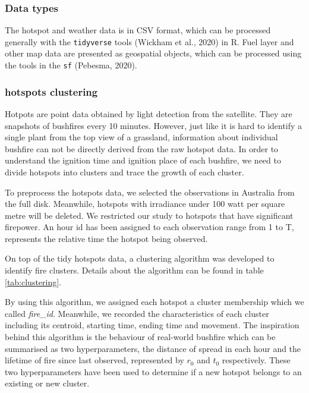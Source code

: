 \documentclass[11pt,a4paper,]{article}
\begin{document}
\hypertarget{data-types}{%
\subsubsection{Data types}\label{data-types}}

The hotspot and weather data is in CSV format, which can be processed generally with the \texttt{tidyverse} tools (Wickham et al., 2020) in R. Fuel layer and other map data are presented as geospatial objects, which can be processed using the tools in the \texttt{sf} (Pebesma, 2020).

\hypertarget{hotspots-clustering}{%
\subsubsection{hotspots clustering}\label{hotspots-clustering}}

Hotpots are point data obtained by light detection from the satellite. They are snapshots of bushfires every 10 minutes. However, just like it is hard to identify a single plant from the top view of a grassland, information about individual bushfire can not be directly derived from the raw hotspot data. In order to understand the ignition time and ignition place of each bushfire, we need to divide hotspots into clusters and trace the growth of each cluster.

To preprocess the hotspots data, we selected the observations in Australia from the full disk. Meanwhile, hotspots with irradiance under 100 watt per square metre will be deleted. We restricted our study to hotspots that have significant firepower. An hour id has been assigned to each observation range from 1 to T, represents the relative time the hotspot being observed.

On top of the tidy hotspots data, a clustering algorithm was developed to identify fire clusters. Details about the algorithm can be found in table \ref{tab:clustering}.

By using this algorithm, we assigned each hotspot a cluster membership which we called \emph{fire\_id}. Meanwhile, we recorded the characteristics of each cluster including its centroid, starting time, ending time and movement. The inspiration behind this algorithm is the behaviour of real-world bushfire which can be summarised as two hyperparameters, the distance of spread in each hour and the lifetime of fire since last observed, represented by \(r_0\) and \(t_0\) respectively. These two hyperparameters have been used to determine if a new hotspot belongs to an existing or new cluster.
\end{document}
